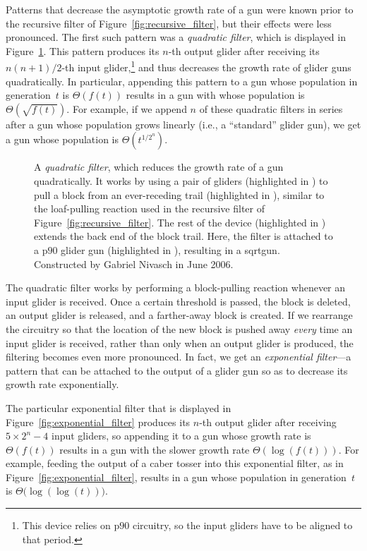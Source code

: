 Patterns that decrease the asymptotic growth rate of a gun were known prior to the recursive filter of Figure~\ref{fig:recursive_filter}, but their effects were less pronounced. The first such pattern was a \emph{quadratic filter}, which is displayed in Figure~\ref{fig:quadratic_filter}. This pattern produces its $n$-th output glider after receiving its $n(n+1)/2$-th input glider,\footnote{This device relies on p$90$ circuitry, so the input gliders have to be aligned to that period.} and thus decreases the growth rate of glider guns quadratically. In particular, appending this pattern to a gun whose population in generation~$t$ is $\Theta(f(t))$ results in a gun with whose population is $\Theta(\sqrt{f(t)})$. For example, if we append $n$ of these quadratic filters in series after a gun whose population grows linearly (i.e., a ``standard'' glider gun), we get a gun whose population is $\Theta(t^{1/2^n})$.

\begin{figure}[!htb]
	\centering
	\caption{A \emph{quadratic filter}, which reduces the growth rate of a gun quadratically. It works by using a pair of gliders (highlighted in ) to pull a block from an ever-receding trail (highlighted in ), similar to the loaf-pulling reaction used in the recursive filter of Figure~\ref{fig:recursive_filter}. The rest of the device (highlighted in ) extends the back end of the block trail. Here, the filter is attached to a p$90$ glider gun (highlighted in ), resulting in a sqrtgun. Constructed by Gabriel Nivasch in June 2006.}\label{fig:quadratic_filter}
\end{figure}

The quadratic filter works by performing a block-pulling reaction whenever an input glider is received. Once a certain threshold is passed, the block is deleted, an output glider is released, and a farther-away block is created. If we rearrange the circuitry so that the location of the new block is pushed away \emph{every} time an input glider is received, rather than only when an output glider is produced, the filtering becomes even more pronounced. In fact, we get an \emph{exponential filter}---a pattern that can be attached to the output of a glider gun so as to decrease its growth rate exponentially.

The particular exponential filter that is displayed in Figure~\ref{fig:exponential_filter} produces its $n$-th output glider after receiving $5 \times 2^n - 4$ input gliders, so appending it to a gun whose growth rate is $\Theta(f(t))$ results in a gun with the slower growth rate $\Theta(\log(f(t)))$. For example, feeding the output of a caber tosser into this exponential filter, as in Figure~\ref{fig:exponential_filter}, results in a gun whose population in generation~$t$ is $\Theta\big(\log(\log(t))\big)$.

